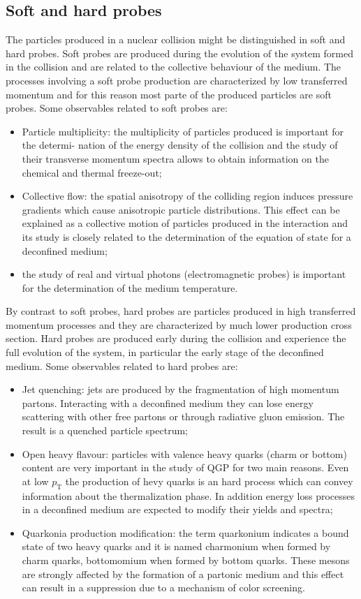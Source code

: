 \subsection{Soft and hard probes}
The particles produced in a nuclear collision might be distinguished in soft and hard probes.
Soft probes are produced during the evolution of the system formed in the collision and are related to the collective behaviour of the medium.
The processes involving a soft probe production are characterized by low transferred momentum and for this reason most parte of the produced particles are soft probes.
Some observables related to soft probes are:
\begin{itemize}
    \item Particle multiplicity: the multiplicity of particles produced is important for the determi- nation of the energy density of the collision and the study of their transverse momentum spectra allows to obtain information on the chemical and thermal freeze-out;
    \item Collective flow: the spatial anisotropy of the colliding region induces pressure gradients which cause anisotropic particle distributions. This effect can be explained as a collective motion of particles produced in the interaction and its study is closely related to the determination of the equation of state for a deconfined medium;
    \item the study of real and virtual photons (electromagnetic probes) is important for the determination of the medium temperature.
\end{itemize}
By contrast to soft probes, hard probes are particles produced in high transferred momentum processes and they are characterized by much lower production cross section.
Hard probes are produced early during the collision and experience the full evolution of the system, in particular the early stage of the deconfined medium.
Some observables related to hard probes are:
\begin{itemize}
    \item Jet quenching: jets are produced by the fragmentation of high momentum partons. Interacting with a deconfined medium they can lose energy scattering with other free partons or through radiative gluon emission. The result is a quenched particle spectrum;
    \item Open heavy flavour: particles with valence heavy quarks (charm or bottom) content are very important in the study of QGP for two main reasons. Even at low $p_{\mathrm{T}}$ the production of hevy quarks is an hard process which can convey information about the thermalization phase. In addition energy loss processes in a deconfined medium are expected to modify their yields and spectra;
    \item Quarkonia production modification: the term quarkonium indicates a bound state of two heavy quarks and it is named charmonium when formed by charm quarks, bottomomium when formed by bottom quarks. These mesons are strongly affected by the formation of a partonic medium and this effect can result in a suppression due to a mechanism of color screening.
\end{itemize}

